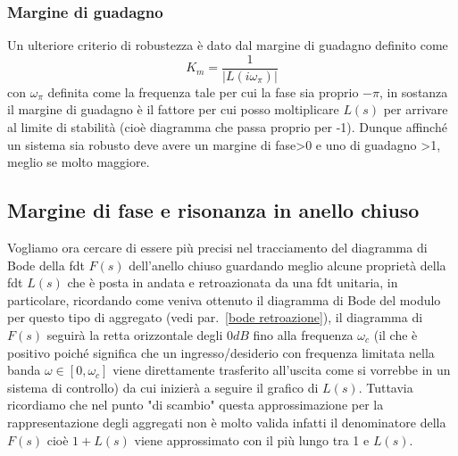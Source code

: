 \documentclass[a4paper]{article}
\begin{document}
	\subsubsection{Margine di guadagno}
	Un ulteriore criterio di robustezza è dato dal margine di guadagno definito come \[K_m=\dfrac{1}{|L(i\omega_{\pi})|}\] con $ \omega_{\pi} $ definita come la frequenza tale per cui la fase sia proprio $-\pi$, in sostanza il margine di guadagno è il fattore per cui posso moltiplicare $ L(s) $ per arrivare al limite di stabilità (cioè diagramma che passa proprio per -1). Dunque affinché un sistema sia robusto deve avere un margine di fase>0 e uno di guadagno >1, meglio se molto maggiore.
	
	\subsection{Margine di fase e risonanza in anello chiuso}
	Vogliamo ora cercare di essere più precisi nel tracciamento del diagramma di Bode della fdt $ F(s) $ dell'anello chiuso guardando meglio alcune proprietà della fdt $ L(s) $ che è posta in andata e retroazionata da una fdt unitaria, in particolare, ricordando come veniva ottenuto il diagramma di Bode del modulo per questo tipo di aggregato (vedi par.~\ref{bode retroazione}), il diagramma di $ F(s) $ seguirà la retta orizzontale degli $ 0dB $ fino alla frequenza $ \omega_c $ (il che è positivo poiché significa che un ingresso/desiderio con frequenza limitata nella banda $\omega\in[0,\omega_c]$ viene direttamente trasferito all'uscita come si vorrebbe in un sistema di controllo) da cui inizierà a seguire il grafico di $ L(s) $. Tuttavia ricordiamo che nel punto "di scambio" questa approssimazione per la rappresentazione degli aggregati non è molto valida infatti il denominatore della $ F(s) $ cioè $ 1+L(s) $ viene approssimato con il più lungo tra 1 e $ L(s) $.
\end{document}
